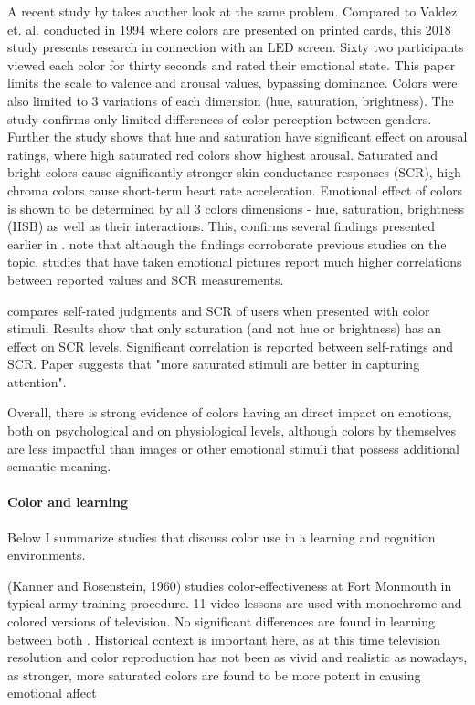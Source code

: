 		A recent study by \cite{Wilms2018} takes another look at the same problem. Compared to Valdez et. al. conducted in 1994 where colors are presented on printed cards, this 2018 study presents research in connection with an LED screen. Sixty two participants viewed each color for thirty seconds and rated their emotional state. This paper limits the scale to valence and arousal values, bypassing dominance. Colors were also limited to 3 variations of each dimension (hue, saturation, brightness). The study confirms only limited differences of color perception between genders. Further the study shows that hue and saturation have significant effect on arousal ratings, where high saturated red colors show highest arousal. Saturated and bright colors cause significantly stronger skin conductance responses (SCR), high chroma colors cause short-term heart rate acceleration. Emotional effect of colors is shown to be determined by all 3 colors dimensions - hue, saturation, brightness (HSB) as well as their interactions. This, confirms several findings presented earlier in \cite{Valdez1994}. \cite{Wilms2018} note that although the findings corroborate previous studies on the topic, studies that have taken emotional pictures report much higher correlations between reported values and SCR measurements.
				
		\cite{Zielinski2016} compares self-rated judgments and SCR of users when presented with color stimuli. Results show that only saturation (and not hue or brightness) has an effect on SCR levels. Significant correlation is reported between self-ratings and SCR. Paper suggests that "more saturated stimuli are better in capturing attention".
		
		Overall, there is strong evidence of colors having an direct impact on emotions, both on psychological and on physiological levels, although colors by themselves are less impactful than images or other emotional stimuli that possess additional semantic meaning.
		
		
		\paragraph{Color and learning} Below I summarize studies that discuss color use in a learning and cognition environments.
		
		
		(Kanner and Rosenstein, 1960) studies color-effectiveness at Fort Monmouth in typical army training procedure. 11 video lessons are used with monochrome and colored versions of television. No significant differences are found in learning between both \cite{Pert1996}. Historical context is important here, as at this time television resolution and color reproduction has not been as vivid and realistic as nowadays, as stronger, more saturated colors are found to be more potent in causing emotional affect \cite{Valdez1994}
		

